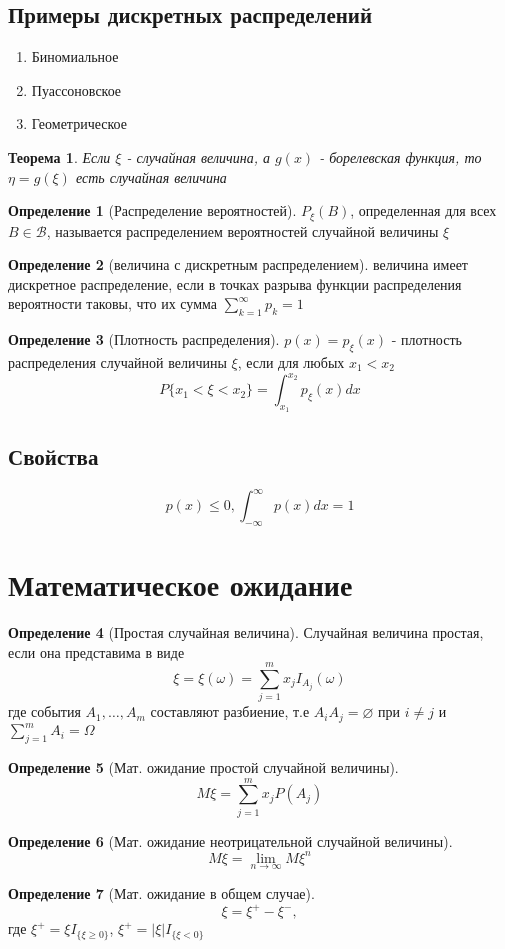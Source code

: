 \documentclass[a4paper]{article}
\newtheorem{theorem}{Теорема}[section]
\theoremstyle{definition}
\newtheorem*{definition}{Определение}
\theoremstyle{remark}
\begin{document}
\subsection{Примеры дискретных распределений}
\begin{enumerate}
    \item Биномиальное
    \item Пуассоновское
    \item Геометрическое
\end{enumerate}
\begin{theorem}
    Если $\xi$ - случайная величина, а $g(x)$ - борелевская функция, то $\eta = g(\xi)$ есть случайная величина
\end{theorem}
\begin{definition}[Распределение вероятностей]
    $P_\xi(B)$, определенная для всех $B\in \mathscr{B}$, называется распределением вероятностей случайной величины $\xi$
\end{definition}
\begin{definition}[величина с дискретным распределением]
    величина имеет дискретное распределение, если в точках разрыва
    функции распределения вероятности таковы, что их сумма $\sum_{k = 1}^{\infty} p_k  = 1$

\end{definition}
    
\begin{definition}[Плотность распределения]
    $p(x) = p_\xi(x)$ - плотность распределения случайной величины $\xi$, если для любых $x_1 < x_2$
    \[P\{x_1 < \xi < x_2\} = \int_{x_1}^{x_2}p_\xi (x)dx\]
\end{definition}
\subsection{Свойства}
\[p(x)\le 0, \int_{-\infty}^{\infty} p(x)dx = 1\]
\section{Математическое ожидание}
\begin{definition}[Простая случайная величина]
    Случайная величина простая, если она представима в виде
    \[\xi = \xi (\omega) = \sum_{j = 1}^m x_j I_{A_j}(\omega)\]
    где события $A_1, \dots, A_m$ составляют разбиение, т.е $A_i A_j = \varnothing$ при $i \neq j$ и $\sum_{j = 1}^m A_i = \Omega$
\end{definition}
\begin{definition}[Мат. ожидание простой случайной величины]
    \[M\xi = \sum_{j = 1}^m x_j P(A_j)\]
\end{definition}
\begin{definition}[Мат. ожидание неотрицательной случайной величины]
    \[M\xi = \lim_{n\to \infty} M\xi^n\]
\end{definition}
\begin{definition}[Мат. ожидание в общем случае]
    \[\xi = \xi^+ - \xi^-,\] где \(\xi^+ = \xi I_{\{\xi\geq 0\}}\), \(\xi^+ = |\xi| I_{\{\xi< 0\}}\)
\end{definition}
\end{document}
